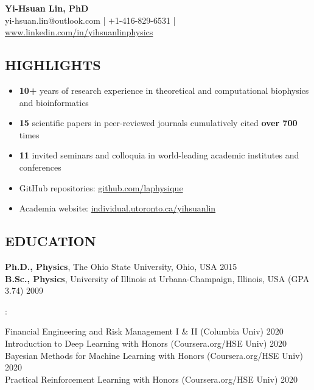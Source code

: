 \documentclass[11pt,letterpaper, sans]{article}
\makeatletter
\newcommand{\newsec}[1]{\subsection*{\hspace{-1.5pt}\uppercase{#1}}}
\newcommand{\newsubsec}[1]{\vspace{0.2cm}{\bf #1}\vspace{0.1cm}}
\def\name{Yi-Hsuan Lin, PhD}
\def\header{
\begin{center}
{\LARGE\bf \name} \vspace{0.3cm} \\
yi-hsuan.lin@outlook.com
| $+$1-416-829-6531 | 
\href{https://www.linkedin.com/in/yihsuanlinphysics}{www.linkedin.com/in/yihsuanlinphysics}
\end{center}
}
\makeatother
\begin{document}
\header

\begin{flushleft}



\newsec{Highlights}

\begin{itemize}[leftmargin=*]\itemsep-0.2em
\item {\bf 10+} years of research experience in theoretical and computational biophysics and bioinformatics
\item {\bf 15} scientific papers in peer-reviewed journals
cumulatively cited {\bf over 700} times
\item {\bf 11} invited seminars and colloquia in world-leading academic institutes and conferences
\item GitHub repositories: \href{https://github.com/laphysique}{github.com/laphysique} 
\item Academia website:  \href{http://individual.utoronto.ca/yihsuanlin}{individual.utoronto.ca/yihsuanlin}
\end{itemize}

\newsec{Education}

{\bf Ph.D., Physics}, The Ohio State University, Ohio, USA \hfill 2015 \\
{\bf B.Sc., Physics}, University of Illinois at Urbana-Champaign, Illinois, USA (GPA 3.74) \hfill 2009

\newsubsec{Certificates}: 

Financial Engineering and Risk Management I \& II (Columbia Univ) \hfill 2020 \\
Introduction to Deep Learning with Honors (Coursera.org/HSE Univ)  \hfill 2020 \\
Bayesian Methods for Machine Learning with Honors (Coursera.org/HSE Univ)  \hfill 2020 \\
Practical Reinforcement Learning with Honors (Coursera.org/HSE Univ)  \hfill 2020 \\


\end{flushleft}
\end{document}
